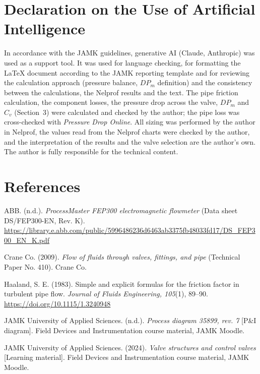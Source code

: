 \documentclass[12pt,a4paper]{article}
\begin{document}
\section*{Declaration on the Use of Artificial Intelligence}
In accordance with the JAMK guidelines, generative AI (Claude, Anthropic) was used as a support tool. It was used for language checking, for formatting the LaTeX document according to the JAMK reporting template and for reviewing the calculation approach (pressure balance, $DP_m$ definition) and the consistency between the calculations, the Nelprof results and the text. The pipe friction calculation, the component losses, the pressure drop across the valve, $DP_m$ and $C_v$ (Section~3) were calculated and checked by the author; the pipe loss was cross-checked with \textit{Pressure Drop Online}. All sizing was performed by the author in Nelprof, the values read from the Nelprof charts were checked by the author, and the interpretation of the results and the valve selection are the author's own. The author is fully responsible for the technical content.

\clearpage
\section*{References}
\begingroup
\setlength{\parindent}{-1.25cm}
\setlength{\leftskip}{1.25cm}
\setlength{\parskip}{8pt}
\raggedright
ABB. (n.d.). \textit{ProcessMaster FEP300 electromagnetic flowmeter} (Data sheet DS/FEP300-EN, Rev. K). \url{https://library.e.abb.com/public/5996486236d6463ab3375fb48033fd17/DS_FEP300_EN_K.pdf}

Crane Co. (2009). \textit{Flow of fluids through valves, fittings, and pipe} (Technical Paper No. 410). Crane Co.

Haaland, S. E. (1983). Simple and explicit formulas for the friction factor in turbulent pipe flow. \textit{Journal of Fluids Engineering, 105}(1), 89--90. \url{https://doi.org/10.1115/1.3240948}

JAMK University of Applied Sciences. (n.d.). \textit{Process diagram 35899, rev. 7} [P\&I diagram]. Field Devices and Instrumentation course material, JAMK Moodle.

JAMK University of Applied Sciences. (2024). \textit{Valve structures and control valves} [Learning material]. Field Devices and Instrumentation course material, JAMK Moodle.
\end{document}
